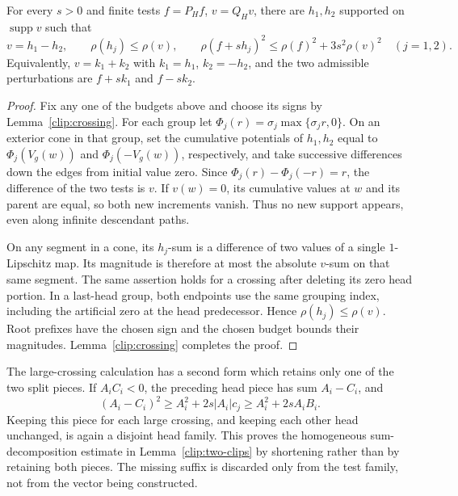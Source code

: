 \begin{lemma}\label{clip:two-clips}
For every $s>0$ and finite tests $f=P_Hf$, $v=Q_Hv$, there are
$h_1,h_2$ supported on $\operatorname{supp}v$ such that
\begin{equation}\label{clip:difference-split}
 v=h_1-h_2,\qquad \rho(h_j)\le\rho(v),\qquad
 \rho(f+sh_j)^2\le\rho(f)^2+3s^2\rho(v)^2\quad(j=1,2).
\end{equation}
Equivalently, $v=k_1+k_2$ with $k_1=h_1$, $k_2=-h_2$, and the
two admissible perturbations are $f+sk_1$ and $f-sk_2$.
\end{lemma}
\begin{proof}
Fix any one of the budgets above and choose its signs by
Lemma~\ref{clip:crossing}. For each group let
$\Phi_j(r)=\sigma_j\max\{\sigma_j r,0\}$. On an exterior cone
in that group, set the cumulative potentials of $h_1,h_2$ equal to
$\Phi_j(V_g(w))$ and $\Phi_j(-V_g(w))$, respectively, and take
successive differences down the edges from initial value zero.
Since $\Phi_j(r)-\Phi_j(-r)=r$, the difference of the two tests
is $v$. If $v(w)=0$, its cumulative values at $w$ and its parent
are equal, so both new increments vanish. Thus no new support appears,
even along infinite descendant paths.

On any segment in a cone, its $h_j$-sum is a difference of two values
of a single $1$-Lipschitz map. Its magnitude is therefore at most the
absolute $v$-sum on that same segment. The same assertion holds for a
crossing after deleting its zero head portion. In a last-head group,
both endpoints use the same grouping index, including the artificial
zero at the head predecessor. Hence $\rho(h_j)\le\rho(v)$.
Root prefixes have the chosen sign and the chosen budget bounds their
magnitudes. Lemma~\ref{clip:crossing} completes the proof.
\end{proof}

The large-crossing calculation has a second form which retains only
one of the two split pieces. If $A_iC_i<0$, the preceding head piece
has sum $A_i-C_i$, and
\begin{equation}\label{clip:shortening}
 (A_i-C_i)^2\ge A_i^2+2s|A_i|c_j
                 \ge A_i^2+2sA_iB_i.
\end{equation}
Keeping this piece for each large crossing, and keeping each other
head unchanged, is again a disjoint head family. This proves the
homogeneous sum-decomposition estimate in
Lemma~\ref{clip:two-clips} by shortening rather than by retaining both
pieces. The missing suffix is discarded only from the test family,
not from the vector being constructed.

